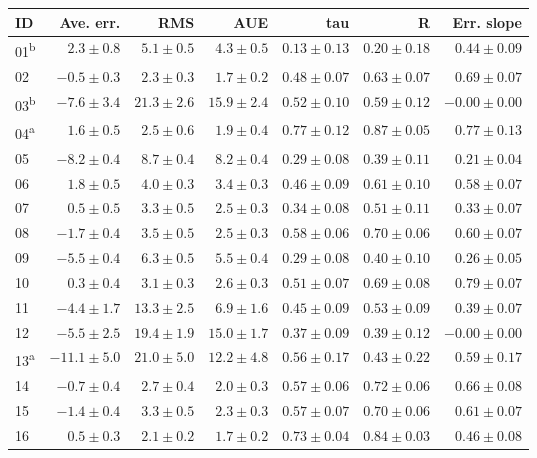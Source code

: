 \begin{tabular}{l r r r r r r}
\hline
ID & Ave. err. & RMS & AUE & tau & R & Err. slope \\ 
\hline
01\textsuperscript{b} & $2.3 \pm 0.8$ & $5.1 \pm 0.5$ & $4.3 \pm 0.5$ & $0.13 \pm 0.13$ & $0.20 \pm 0.18$ & $0.44 \pm 0.09$ \\ 
02 & $-0.5 \pm 0.3$ & $2.3 \pm 0.3$ & $1.7 \pm 0.2$ & $0.48 \pm 0.07$ & $0.63 \pm 0.07$ & $0.69 \pm 0.07$ \\ 
03\textsuperscript{b} & $-7.6 \pm 3.4$ & $21.3 \pm 2.6$ & $15.9 \pm 2.4$ & $0.52 \pm 0.10$ & $0.59 \pm 0.12$ & $-0.00 \pm 0.00$ \\ 
04\textsuperscript{a} & $1.6 \pm 0.5$ & $2.5 \pm 0.6$ & $1.9 \pm 0.4$ & $0.77 \pm 0.12$ & $0.87 \pm 0.05$ & $0.77 \pm 0.13$ \\ 
05 & $-8.2 \pm 0.4$ & $8.7 \pm 0.4$ & $8.2 \pm 0.4$ & $0.29 \pm 0.08$ & $0.39 \pm 0.11$ & $0.21 \pm 0.04$ \\ 
06 & $1.8 \pm 0.5$ & $4.0 \pm 0.3$ & $3.4 \pm 0.3$ & $0.46 \pm 0.09$ & $0.61 \pm 0.10$ & $0.58 \pm 0.07$ \\ 
07 & $0.5 \pm 0.5$ & $3.3 \pm 0.5$ & $2.5 \pm 0.3$ & $0.34 \pm 0.08$ & $0.51 \pm 0.11$ & $0.33 \pm 0.07$ \\ 
08 & $-1.7 \pm 0.4$ & $3.5 \pm 0.5$ & $2.5 \pm 0.3$ & $0.58 \pm 0.06$ & $0.70 \pm 0.06$ & $0.60 \pm 0.07$ \\ 
09 & $-5.5 \pm 0.4$ & $6.3 \pm 0.5$ & $5.5 \pm 0.4$ & $0.29 \pm 0.08$ & $0.40 \pm 0.10$ & $0.26 \pm 0.05$ \\ 
10 & $0.3 \pm 0.4$ & $3.1 \pm 0.3$ & $2.6 \pm 0.3$ & $0.51 \pm 0.07$ & $0.69 \pm 0.08$ & $0.79 \pm 0.07$ \\ 
11 & $-4.4 \pm 1.7$ & $13.3 \pm 2.5$ & $6.9 \pm 1.6$ & $0.45 \pm 0.09$ & $0.53 \pm 0.09$ & $0.39 \pm 0.07$ \\ 
12 & $-5.5 \pm 2.5$ & $19.4 \pm 1.9$ & $15.0 \pm 1.7$ & $0.37 \pm 0.09$ & $0.39 \pm 0.12$ & $-0.00 \pm 0.00$ \\ 
13\textsuperscript{a} & $-11.1 \pm 5.0$ & $21.0 \pm 5.0$ & $12.2 \pm 4.8$ & $0.56 \pm 0.17$ & $0.43 \pm 0.22$ & $0.59 \pm 0.17$ \\ 
14 & $-0.7 \pm 0.4$ & $2.7 \pm 0.4$ & $2.0 \pm 0.3$ & $0.57 \pm 0.06$ & $0.72 \pm 0.06$ & $0.66 \pm 0.08$ \\ 
15 & $-1.4 \pm 0.4$ & $3.3 \pm 0.5$ & $2.3 \pm 0.3$ & $0.57 \pm 0.07$ & $0.70 \pm 0.06$ & $0.61 \pm 0.07$ \\ 
16 & $0.5 \pm 0.3$ & $2.1 \pm 0.2$ & $1.7 \pm 0.2$ & $0.73 \pm 0.04$ & $0.84 \pm 0.03$ & $0.46 \pm 0.08$ \\ 

\end{tabular}
